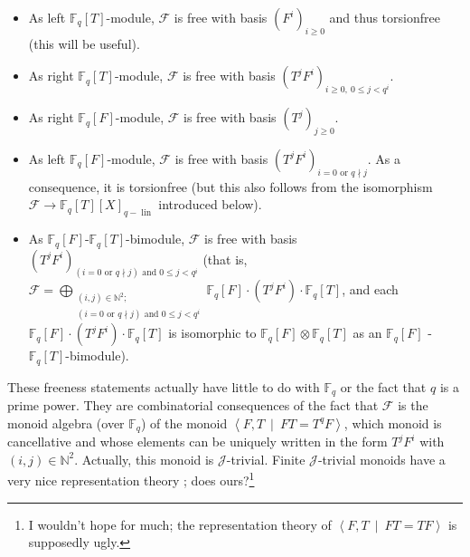 \documentclass[numbers=enddot,12pt,final,onecolumn,notitlepage]{scrartcl}%
\theoremstyle{definition}
\begin{document}
\begin{itemize}
\item As left $\mathbb{F}_{q}\left[  T\right]  $-module, $\mathcal{F}$ is free
with basis $\left(  F^{i}\right)  _{i\geq0}$ and thus torsionfree (this will
be useful).

\item As right $\mathbb{F}_{q}\left[  T\right]  $-module, $\mathcal{F}$ is
free with basis $\left(  T^{j}F^{i}\right)  _{i\geq0,\ 0\leq j<q^{i}}$.

\item As right $\mathbb{F}_{q}\left[  F\right]  $-module, $\mathcal{F}$ is
free with basis $\left(  T^{j}\right)  _{j\geq0}$.

\item As left $\mathbb{F}_{q}\left[  F\right]  $-module, $\mathcal{F}$ is free
with basis $\left(  T^{j}F^{i}\right)  _{i=0\text{ or }q\nmid j}$. As a
consequence, it is torsionfree (but this also follows from the isomorphism
$\mathcal{F}\rightarrow\mathbb{F}_{q}\left[  T\right]  \left[  X\right]
_{q-\operatorname*{lin}}$ introduced below).

\item As $\mathbb{F}_{q}\left[  F\right]  $-$\mathbb{F}_{q}\left[  T\right]
$-bimodule, $\mathcal{F}$ is free with basis $\left(  T^{j}F^{i}\right)
_{\left(  i=0\text{ or }q\nmid j\right)  \text{ and }0\leq j<q^{i}}$ (that is,
$\mathcal{F}=\bigoplus\limits_{\substack{\left(  i,j\right)  \in\mathbb{N}%
^{2};\\\left(  i=0\text{ or }q\nmid j\right)  \text{ and }0\leq j<q^{i}%
}}\mathbb{F}_{q}\left[  F\right]  \cdot\left(  T^{j}F^{i}\right)
\cdot\mathbb{F}_{q}\left[  T\right]  $, and each $\mathbb{F}_{q}\left[
F\right]  \cdot\left(  T^{j}F^{i}\right)  \cdot\mathbb{F}_{q}\left[  T\right]
$ is isomorphic to $\mathbb{F}_{q}\left[  F\right]  \otimes\mathbb{F}%
_{q}\left[  T\right]  $ as an $\mathbb{F}_{q}\left[  F\right]  $%
-$\mathbb{F}_{q}\left[  T\right]  $-bimodule).
\end{itemize}

These freeness statements actually have little to do with $\mathbb{F}_{q}$ or
the fact that $q$ is a prime power. They are combinatorial consequences of the
fact that $\mathcal{F}$ is the monoid algebra (over $\mathbb{F}_{q}$) of the
monoid $\left\langle F,T\ \mid\ FT=T^{q}F\right\rangle $, which monoid is
cancellative and whose elements can be uniquely written in the form
$T^{j}F^{i}$ with $\left(  i,j\right)  \in\mathbb{N}^{2}$. Actually, this
monoid is $\mathcal{J}$-trivial. Finite $\mathcal{J}$-trivial monoids have a
very nice representation theory \cite{dhns}; does ours?\footnote{I wouldn't
hope for much; the representation theory of $\left\langle F,T\ \mid
\ FT=TF\right\rangle $ is supposedly ugly.}
\end{document}
